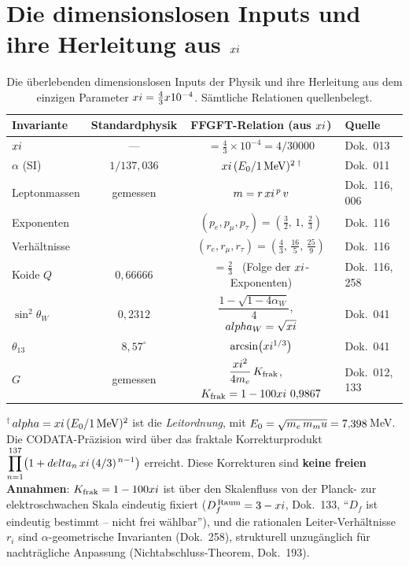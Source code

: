 \section{Die dimensionslosen Inputs und ihre Herleitung aus $xi$}

\begin{table}[htbp]
  \centering
  \caption{Die überlebenden dimensionslosen Inputs der Physik und ihre
           Herleitung aus dem einzigen Parameter $xi=\tfrac{4}{3}x10^{-4}$.
           Sämtliche Relationen quellenbelegt.}
  \label{tab:xi-inputs}
  {\footnotesize\setlength{\tabcolsep}{4pt}
  \begin{tabular}{lccl}
    \toprule
    Invariante & Standardphysik & FFGFT-Relation (aus $xi$) & Quelle \\
    \midrule
    $xi$           & ---            & $=\tfrac{4}{3}\times10^{-4}=4/30000$ & Dok.~013 \\
    $\alpha$ (SI)      & $1/137{,}036$  & $xi\,(E_0/1\,\mathrm{MeV})^2$\,$^{\dagger}$ & Dok.~011 \\
    Leptonmassen       & gemessen       & $m=r\,xi^{\,p}\,v$ & Dok.~116, 006 \\
    \quad Exponenten   &                & $(p_e,p_\mu,p_\tau)=(\tfrac{3}{2},\,1,\,\tfrac{2}{3})$ & Dok.~116 \\
    \quad Verhältnisse &                & $(r_e,r_\mu,r_\tau)=(\tfrac{4}{3},\,\tfrac{16}{5},\,\tfrac{25}{9})$ & Dok.~116 \\
    Koide $Q$          & $0{,}66666$    & $=\tfrac{2}{3}$ \ (Folge der $xi$-Exponenten) & Dok.~116, 258 \\
    $\sin^2\theta_W$   & $0{,}2312$     & $\dfrac{1-\sqrt{1-4\alpha_W}}{4}$,\ \ $alpha_W=\sqrt{xi}$ & Dok.~041 \\[0.6em]
    $\theta_{13}$      & $8{,}57^\circ$ & $\arcsin\!\big(xi^{1/3}\big)$ & Dok.~041 \\
    $G$                & gemessen       & $\dfrac{xi^2}{4m_e}\,K_{\text{frak}}$,\ \ $K_{\text{frak}}=1-100xi~0{,}9867$ & Dok.~012, 133 \\
    \bottomrule
  \end{tabular}}

  \medskip
  \footnotesize
  $^{\dagger}$\,$alpha=xi\,(E_0/1\,\mathrm{MeV})^2$ ist die \emph{Leitordnung},
  mit $E_0=\sqrt{m_e\,m_mu}=7{,}398$\,MeV.
  Die CODATA-Präzision wird über das fraktale Korrekturprodukt
  $\displaystyle\prod_{n=1}^{137}\!\big(1+delta_n\,xi\,(4/3)^{\,n-1}\big)$
  erreicht. Diese Korrekturen sind \textbf{keine freien Annahmen}:
  $K_{\text{frak}}=1-100xi$ ist über den Skalenfluss von der Planck- zur
  elektroschwachen Skala eindeutig fixiert ($D_f^{\,\mathrm{Raum}}=3-xi$,
  Dok.~133, ``$D_f$ ist eindeutig bestimmt -- nicht frei wählbar''), und die
  rationalen Leiter-Verhältnisse $r_i$ sind $\alpha$-geometrische Invarianten
  (Dok.~258), strukturell unzugänglich für nachträgliche Anpassung
  (Nichtabschluss-Theorem, Dok.~193).
\end{table}

